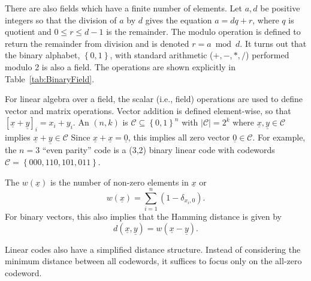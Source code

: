 There are also fields which have a finite number of elements.
Let $a,d$ be positive integers so that the division of $a$ by $d$ gives the equation $a = dq+r$, where $q$ is quotient and $0\leq r \leq d-1$ is the remainder.
The modulo operation is defined to return the remainder from division and is denoted $r = a \bmod d$.
It turns out that the binary alphabet, $\left\{ 0,1\right\} $, with standard arithmetic ($+,-,*,/$) performed modulo 2 is also a field.
The operations are shown explicitly in Table~\ref{tab:BinaryField}.

For linear algebra over a field, the scalar (i.e., field) operations are used to define vector and matrix operations.
Vector addition is defined element-wise, so that $\left[\underline{x}+\underline{y}\right]_{i}=x_{i}+y_{i}$.
An $(n,k)$  is $\mathcal{C}\subseteq\left\{ 0,1\right\} ^{n}$ with $\left|\mathcal{C}\right|=2^{k}$ where $\underline{x},\underline{y}\in\mathcal{C}$ implies $\underline{x}+\underline{y}\in\mathcal{C}$
Since $\underline{x}+\underline{x}=\underline{0}$, this implies all zero vector $\underline{0}\in\mathcal{C}$.
For example, the $n=3$ ``even parity'' code is a (3,2) binary linear code with codewords $\mathcal{C}=\left\{ 000,110,101,011\right\} $.

\begin{definition}
The  $w(\underline{x})$ is the number of non-zero elements in $\underline{x}$ or
\[ w(\underline{x}) = \sum_{i=1}^{n}(1-\delta_{x_i , 0}). \]
For binary vectors, this also implies that the Hamming distance is given by
\[d(\underline{x},\underline{y})=w(\underline{x}-\underline{y}). \]
\end{definition}

Linear codes also have a simplified distance structure.
Instead of considering the minimum distance between all codewords, it suffices to focus only on the all-zero codeword.


